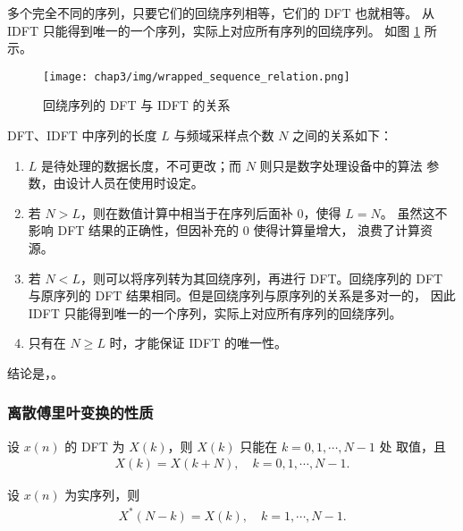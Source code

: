 \begin{remark}
    多个完全不同的序列，只要它们的回绕序列相等，它们的 DFT 也就相等。
    从 IDFT 只能得到唯一的一个序列，实际上对应所有序列的回绕序列。
    如图 \ref{fig:wrapped_sequence_relation} 所示。
    \begin{figure}[H]
        \centering
        \texttt{[image: chap3/img/wrapped\_sequence\_relation.png]}
        \caption{回绕序列的 DFT 与 IDFT 的关系}
        \label{fig:wrapped_sequence_relation}
    \end{figure}
\end{remark}

\begin{corollary}[$N$ 与 $L$ 的关系]
    DFT、IDFT 中序列的长度 $L$ 与频域采样点个数 $N$ 之间的关系如下：
    \begin{enumerate}[label=(\arabic*)]
        \item $L$ 是待处理的数据长度，不可更改；而 $N$ 则只是数字处理设备中的算法
            参数，由设计人员在使用时设定。
        \item 若 $N > L$，则在数值计算中相当于在序列后面补 $0$，使得 $L = N$。
            虽然这不影响 DFT 结果的正确性，但因补充的 $0$ 使得计算量增大，
            浪费了计算资源。
        \item 若 $N < L$，则可以将序列转为其回绕序列，再进行 DFT。回绕序列的 DFT
            与原序列的 DFT 结果相同。但是回绕序列与原序列的关系是多对一的，
            因此 IDFT 只能得到唯一的一个序列，实际上对应所有序列的回绕序列。
        \item 只有在 $N \ge L$ 时，才能保证 IDFT 的唯一性。
    \end{enumerate}
    结论是，。
\end{corollary}

\subsubsection{离散傅里叶变换的性质}

\begin{property}
    设 $x(n)$ 的 DFT 为 $X(k)$，则 $X(k)$ 只能在 $k = 0, 1, \cdots, N - 1$ 处
    取值，且
    \begin{align*}
        X(k) = X(k + N), \quad k = 0, 1, \cdots, N - 1.
    \end{align*}
\end{property}

\begin{property}
    \label{property:dft_conjugate_symmetry}
    设 $x(n)$ 为实序列，则
    \begin{align*}
        X^*(N - k) = X(k), \quad k = 1, \cdots, N - 1.
    \end{align*}
\end{property}

